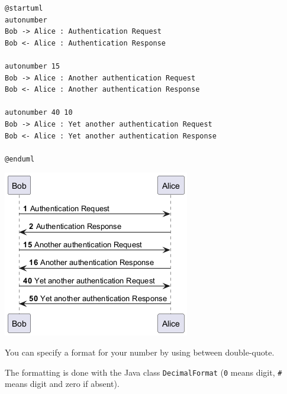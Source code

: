 \begin{verbatim}
@startuml
autonumber
Bob -> Alice : Authentication Request
Bob <- Alice : Authentication Response

autonumber 15
Bob -> Alice : Another authentication Request
Bob <- Alice : Another authentication Response

autonumber 40 10
Bob -> Alice : Yet another authentication Request
Bob <- Alice : Yet another authentication Response

@enduml
\end{verbatim}
\begin{center}
\includegraphics[scale=0.60]{imgw/img-bb76bd00dba7cddb71dfe94cabccc9be.png}
\end{center}




You can specify a format for your number by using between double-quote.


The formatting is done with the Java class \texttt{DecimalFormat}
(\texttt{0} means digit, \texttt{\#} means digit and zero if absent).


